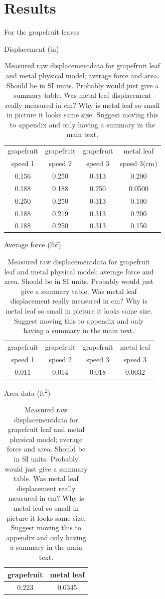 \section{Results}
For the grapefruit leaves 

\begin{table}
\caption{Measured raw displacementdata for grapefruit leaf and metal physical model; average force and area. Should be in SI units. Probably would just give a summary table. Was metal leaf displacement really measured in \si{\centi\meter}? Why is metal leaf so small in picture it looks same size. Suggest moving this to appendix and only having a summary in the main text.}
\label{tbl:results1}

\begin{center}
Displacement (\si{in})\\
\begin{tabular}{cccc}
\toprule
grapefruit & grapefruit & grapefruit & metal leaf \\
speed 1 & speed 2 & speed 3 & speed 3(cm) \\ 
\midrule
0.156 & 0.250 & 0.313 & 0.200 \\
0.188 & 0.188 & 0.250 & 0.0500 \\
0.250 & 0.250 & 0.313 & 0.100 \\
0.188 & 0.219 & 0.313 & 0.200 \\
0.188 & 0.250 & 0.313 & 0.150 \\
\bottomrule
\end{tabular}
\end{center}

\begin{center}
Average force (\si{lbf})\\
\begin{tabular}{cccc}
\toprule
grapefruit & grapefruit & grapefruit & metal leaf \\
speed 1 & speed 2 & speed 3 & speed 3 \\
\midrule
0.011 & 0.014 & 0.018 & 0.0032\\
\bottomrule
\end{tabular}
\end{center}

\begin{center}
Area data (\si{ft\squared})\\
\begin{tabular}{cc}
\toprule
grapefruit & metal leaf \\ %
\midrule
0.223 & 0.0345 \\ %
\bottomrule
\end{tabular}
\end{center}
\end{table}




